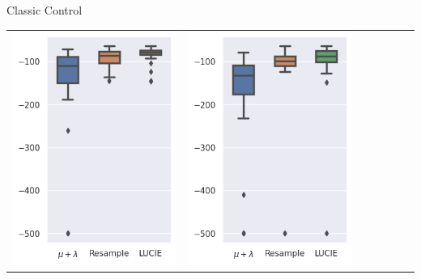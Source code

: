 \begin{frame}{\tcv{} Classic Control}
\begin{table}[]
\begin{tabular}{ccccccc}
                \includegraphics[width=\figwidth]{images/LUCIE/acrobot/boxplot_acrobot_400_u.png} &
                \includegraphics[width=\figwidth]{images/LUCIE/acrobot/boxplot_acrobot_600_u.png} &

\end{tabular}
\end{table}
\end{frame}
